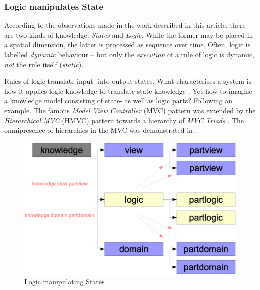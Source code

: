 %
%
%
%
%
%
%

\subsubsection{Logic manipulates State}
\label{logic_manipulates_state_heading}

According to the observations made in the work described in this article, there
are two kinds of knowledge: \emph{States} and \emph{Logic}. While the former
may be placed in a spatial dimension, the latter is processed as sequence over
time. Often, logic is labelled \emph{dynamic} behaviour -- but only the
\emph{execution} of a rule of logic is dynamic, \emph{not} the rule itself
(\emph{static}).

Rules of logic translate input- into output states. What characterises a system
is how it applies logic knowledge to translate state knowledge \cite{heller2002}.
Yet how to imagine a knowledge model consisting of state- as well as logic
parts? Following an example. The famous \emph{Model View Controller} (MVC)
pattern was extended by the \emph{Hierarchical MVC} (HMVC) pattern towards a
hierarchy of \emph{MVC Triads} \cite{cai}. The omnipresence of hierarchies in
the MVC was demonstrated in \cite{hellerbohl}.

\begin{figure}[ht]
    \begin{center}
        \includegraphics[scale=0.2]{vector/mvctree.eps}
        \caption{Logic manipulating States}
        \label{mvctree_figure}
    \end{center}
\end{figure}

